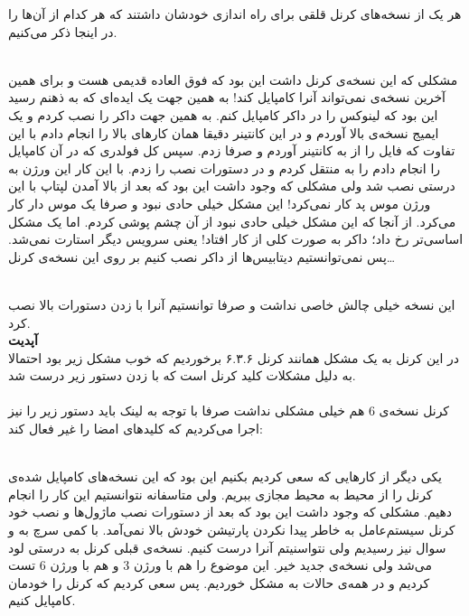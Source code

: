 هر یک از نسخه‌های کرنل قلقی برای راه اندازی خودشان داشتند که هر کدام از آن‌ها را در اینجا
ذکر می‌کنیم.

\\\noindent
مشکلی که این نسخه‌ی کرنل داشت این بود که فوق العاده قدیمی هست و برای همین آخرین نسخه‌ی
نمی‌تواند آنرا کامپایل کند! به همین جهت یک ایده‌ای که به ذهنم رسید این بود که لینوکس را در داکر
کامپایل کنم. به همین جهت داکر را نصب کردم و یک ایمیج نسخه‌ی
بالا آوردم و در این کانتینر دقیقا همان کار‌های بالا را انجام دادم با این تفاوت که فایل
را از
به کانتینر آوردم و صرفا
زدم. سپس کل فولدری که در آن کامپایل را انجام دادم را به
منتقل کردم و در
دستورات نصب را زدم. با این کار این ورژن به درستی نصب شد ولی مشکلی که وجود داشت این بود که
بعد از بالا آمدن لپتاپ با این ورژن موس پد کار نمی‌کرد! این مشکل خیلی حادی نبود و صرفا یک موس
دار کار می‌کرد. از آنجا که این مشکل خیلی حادی نبود از آن چشم پوشی کردم. اما یک مشکل اساسی‌تر رخ داد؛
داکر به صورت کلی از کار افتاد! یعنی سرویس
دیگر استارت نمی‌شد. پس نمی‌توانستیم دیتابیس‌ها از داکر نصب کنیم بر روی این نسخه‌ی کرنل\dots

\\\noindent
این نسخه خیلی چالش خاصی نداشت و صرفا توانستیم آنرا با زدن دستورات بالا نصب کرد.
\\
\textbf{آپدیت}
\\
در این کرنل به یک مشکل همانند کرنل ۶.۳.۶ برخوردیم که خوب مشکل زیر بود 
احتمالا به دلیل مشکلات کلید کرنل است که با زدن دستور زیر درست شد.
\\
\\\noindent
کرنل نسخه‌ی 6 هم خیلی مشکلی نداشت صرفا با توجه به
لینک باید دستور زیر را نیز اجرا می‌کردیم که کلید‌های امضا را غیر فعال کند:

\\\noindent
یکی دیگر از کار‌هایی که سعی کردیم بکنیم این بود که این نسخه‌های کامپایل شده‌ی کرنل را از محیط
به محیط مجازی ببریم. ولی متاسفانه نتوانستیم این کار را انجام دهیم. مشکلی که وجود داشت این بود که بعد از
دستورات نصب ماژول‌ها و نصب خود کرنل سیستم‌عامل به خاطر پیدا نکردن پارتیشن خودش بالا نمی‌آمد. با کمی سرچ به
و
سوال نیز رسیدیم ولی نتواسنیتم آنرا درست کنیم. نسخه‌ی قبلی کرنل به درستی لود می‌شد ولی نسخه‌ی جدید خیر.
این موضوع را هم با ورژن 3 و هم با ورژن 6 تست کردیم و در همه‌ی حالات به مشکل خوردیم. پس سعی کردیم که کرنل
را خودمان کامپایل کنیم.

